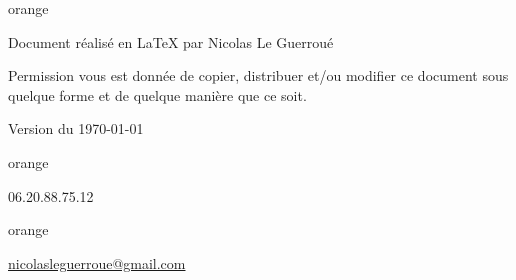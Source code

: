 
\begin{items}{orange}{\Triangle}
\item Document réalisé en \LaTeX{} par Nicolas Le Guerroué 
\item Permission vous est donnée de copier, distribuer et/ou modifier ce document sous quelque forme et de quelque manière que ce soit.
\item Version du \today
\end{items}


\begin{items}{orange}{\faPhone}
    \item 06.20.88.75.12
\end{items}

\begin{items}{orange}{\faEnvelope}
    \item \href{mailto:nicolasleguerroue@gmail.com}{nicolasleguerroue@gmail.com}
\end{items}
